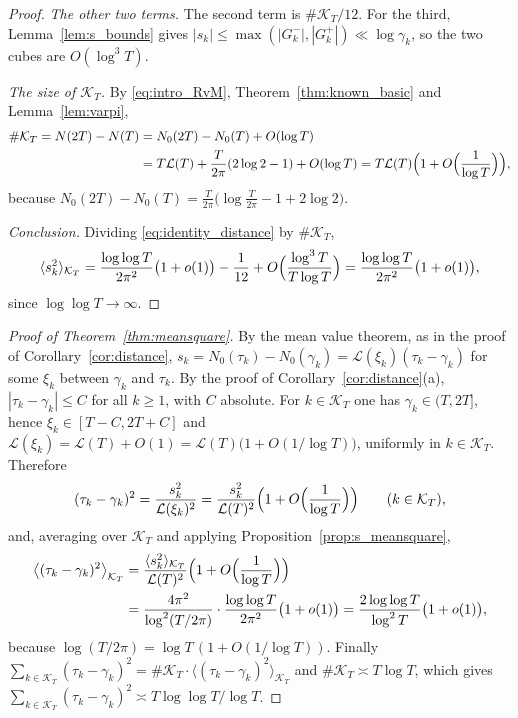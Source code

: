 \documentclass[11pt,a4paper]{article}
\makeatletter
\numberwithin{equation}{section}
\DeclareRobustCommand{\CGref}[1]{\ref{#1}}
\DeclareRobustCommand{\CGeqref}[1]{\eqref{#1}}
\let\CG@origref\ref
\let\CG@origeqref\eqref
\newcommand{\CG@gettip}[1]{\@ifundefined{CGTip@#1}{#1}{\csname CGTip@#1\endcsname}}
\DeclareRobustCommand{\CGref}[1]{\pdftooltip{\CG@origref{#1}}{\CG@gettip{#1}}}
\DeclareRobustCommand{\CGeqref}[1]{\pdftooltip{\CG@origeqref{#1}}{\CG@gettip{#1}}}
\theoremstyle{definition}
\theoremstyle{remark}
\newcommand{\Nz}{N_0} %
\newcommand{\lL}{\mathcal L}
\newcommand{\Kc}{\mathcal K}
\makeatother
\begin{document}
\begin{proof}
\emph{The other two terms.} The second term is $\#\Kc_T/12$. For the third, Lemma~\CGref{lem:s_bounds} gives $|s_k|\le\max(|G_k^-|,|G_k^+|)\ll\log\gamma_k$, so the two cubes are $O(\log^3T)$.

\emph{The size of $\Kc_T$.} By \CGeqref{eq:intro_RvM}, Theorem~\CGref{thm:known_basic} and Lemma~\CGref{lem:varpi},
\begin{equation}
\begin{aligned}
\#\Kc_T=N(2T)-N(T)&=\Nz(2T)-\Nz(T)+O(\log T)\\
&=T\lL(T)+\frac{T}{2\pi}(2\log2-1)+O(\log T)=T\lL(T)\Bigl(1+O\Bigl(\frac1{\log T}\Bigr)\Bigr),
\end{aligned}
\label{eq:disp_33}
\end{equation}
because $\Nz(2T)-\Nz(T)=\frac T{2\pi}\bigl(\log\frac T{2\pi}-1+2\log2\bigr)$.

\emph{Conclusion.} Dividing \CGeqref{eq:identity_distance} by $\#\Kc_T$,
\begin{equation}
\langle s_k^2\rangle_{\Kc_T}=\frac{\log\log T}{2\pi^2}\bigl(1+o(1)\bigr)-\frac1{12}+O\Bigl(\frac{\log^3T}{T\log T}\Bigr)=\frac{\log\log T}{2\pi^2}\bigl(1+o(1)\bigr),
\label{eq:disp_34}
\end{equation}
since $\log\log T\to\infty$.
\end{proof}

\begin{proof}[Proof of Theorem~\ref{thm:meansquare}]
By the mean value theorem, as in the proof of Corollary~\CGref{cor:distance}, $s_k=\Nz(\tau_k)-\Nz(\gamma_k)=\lL(\xi_k)(\tau_k-\gamma_k)$ for some $\xi_k$ between $\gamma_k$ and $\tau_k$. By the proof of Corollary~\CGref{cor:distance}(a), $|\tau_k-\gamma_k|\le C$ for all $k\ge1$, with $C$ absolute. For $k\in\Kc_T$ one has $\gamma_k\in(T,2T]$, hence $\xi_k\in[T-C,2T+C]$ and $\lL(\xi_k)=\lL(T)+O(1)=\lL(T)\bigl(1+O(1/\log T)\bigr)$, uniformly in $k\in\Kc_T$. Therefore
\begin{equation}
(\tau_k-\gamma_k)^2=\frac{s_k^2}{\lL(\xi_k)^2}=\frac{s_k^2}{\lL(T)^2}\Bigl(1+O\Bigl(\frac1{\log T}\Bigr)\Bigr)\qquad(k\in\Kc_T),
\label{eq:disp_35}
\end{equation}
and, averaging over $\Kc_T$ and applying Proposition~\CGref{prop:s_meansquare},
\begin{equation}
\begin{aligned}
\bigl\langle(\tau_k-\gamma_k)^2\bigr\rangle_{\Kc_T}&=\frac{\langle s_k^2\rangle_{\Kc_T}}{\lL(T)^2}\Bigl(1+O\Bigl(\frac1{\log T}\Bigr)\Bigr)\\
&=\frac{4\pi^2}{\log^2(T/2\pi)}\cdot\frac{\log\log T}{2\pi^2}\bigl(1+o(1)\bigr)=\frac{2\log\log T}{\log^2T}\bigl(1+o(1)\bigr),
\end{aligned}
\label{eq:disp_36}
\end{equation}
because $\log(T/2\pi)=\log T\,(1+O(1/\log T))$. Finally $\sum_{k\in\Kc_T}(\tau_k-\gamma_k)^2=\#\Kc_T\cdot\langle(\tau_k-\gamma_k)^2\rangle_{\Kc_T}$ and $\#\Kc_T\asymp T\log T$, which gives $\sum_{k\in\Kc_T}(\tau_k-\gamma_k)^2\asymp T\log\log T/\log T$.
\end{proof}
\end{document}
